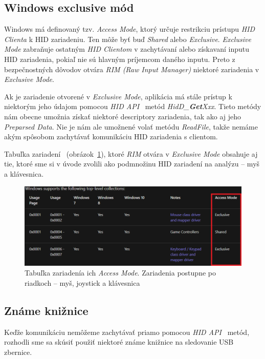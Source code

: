 \subsection{Windows exclusive mód}
Windows má definovaný tzv. \textit{Access Mode}, ktorý určuje restrikciu prístupu \textit{HID Clienta} k HID zariadeniu. 
Ten môže byť buď \textit{Shared} alebo \textit{Exclusive}. \textit{Exclusive Mode} zabraňuje ostatným \textit{HID Clientom} v zachytávaní alebo získavaní inputu HID zariadenia, pokiaľ nie sú hlavným príjemcom daného inputu. Preto z bezpečnostných dôvodov otvára \textit{RIM (Raw Input Manager)} niektoré zariadenia v \textit{Exclusive Mode}.

Ak je zariadenie otvorené v \textit{Exclusive Mode}, aplikácia má stále prístup k niektorým jeho údajom pomocou  \textit{HID API}~\cite{hid_api} metód  \textit{HidD\_\textbf{Get}Xxx}. Tieto metódy nám obecne umožnia získať niektoré descriptory zariadenia, tak ako aj jeho \textit{Preparsed Data}. Nie je nám ale umožnené volať metódu \textit{ReadFile}, takže nemáme akým spôsobom zachytávať komunikáciu HID zariadenia s clientom.

Tabuľka zariadení~\cite{hid_access} (obrázok~\ref{obr:kap3:access_mode}), ktoré \textit{RIM} otvára v \textit{Exclusive Mode} obsahuje aj tie, ktoré sme si v úvode zvolili ako podmnožinu HID zariadení na analýzu -- myš a klávesnica.

\begin{figure}[!htb]
	\centering
	\includegraphics[width=\textwidth]{img/kap3_access_mode}
	\caption{Tabuľka zariadenía ich \textit{Access Mode}. Zariadenia postupne po riadkoch -- myš, joystick a klávesnica}
	\label{obr:kap3:access_mode}
\end{figure}

\subsection{Známe knižnice}
Keďže komunikáciu nemôžeme zachytávať priamo pomocou \textit{HID API}~\cite{hid_api} metód, rozhodli sme sa skúsiť použiť niektoré známe knižnice na sledovanie USB zbernice. 

